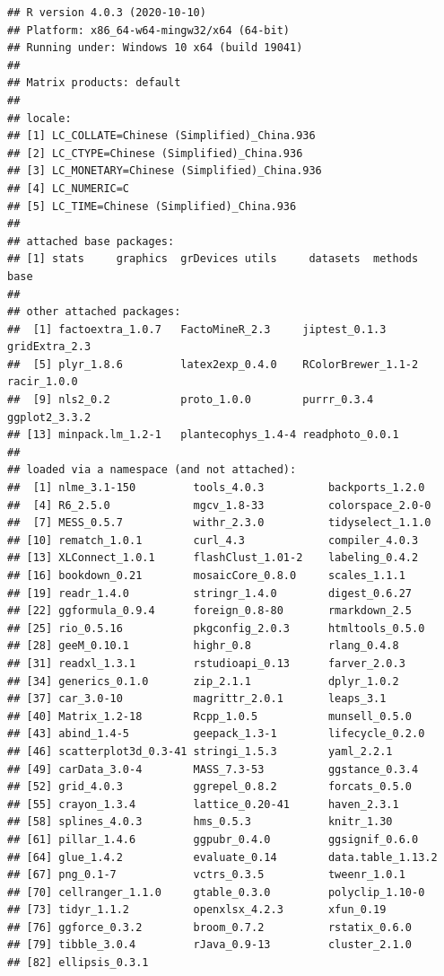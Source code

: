 \documentclass[
]{krantz}
\begin{document}
\begin{verbatim}
## R version 4.0.3 (2020-10-10)
## Platform: x86_64-w64-mingw32/x64 (64-bit)
## Running under: Windows 10 x64 (build 19041)
## 
## Matrix products: default
## 
## locale:
## [1] LC_COLLATE=Chinese (Simplified)_China.936 
## [2] LC_CTYPE=Chinese (Simplified)_China.936   
## [3] LC_MONETARY=Chinese (Simplified)_China.936
## [4] LC_NUMERIC=C                              
## [5] LC_TIME=Chinese (Simplified)_China.936    
## 
## attached base packages:
## [1] stats     graphics  grDevices utils     datasets  methods   base     
## 
## other attached packages:
##  [1] factoextra_1.0.7   FactoMineR_2.3     jiptest_0.1.3      gridExtra_2.3     
##  [5] plyr_1.8.6         latex2exp_0.4.0    RColorBrewer_1.1-2 racir_1.0.0       
##  [9] nls2_0.2           proto_1.0.0        purrr_0.3.4        ggplot2_3.3.2     
## [13] minpack.lm_1.2-1   plantecophys_1.4-4 readphoto_0.0.1   
## 
## loaded via a namespace (and not attached):
##  [1] nlme_3.1-150         tools_4.0.3          backports_1.2.0     
##  [4] R6_2.5.0             mgcv_1.8-33          colorspace_2.0-0    
##  [7] MESS_0.5.7           withr_2.3.0          tidyselect_1.1.0    
## [10] rematch_1.0.1        curl_4.3             compiler_4.0.3      
## [13] XLConnect_1.0.1      flashClust_1.01-2    labeling_0.4.2      
## [16] bookdown_0.21        mosaicCore_0.8.0     scales_1.1.1        
## [19] readr_1.4.0          stringr_1.4.0        digest_0.6.27       
## [22] ggformula_0.9.4      foreign_0.8-80       rmarkdown_2.5       
## [25] rio_0.5.16           pkgconfig_2.0.3      htmltools_0.5.0     
## [28] geeM_0.10.1          highr_0.8            rlang_0.4.8         
## [31] readxl_1.3.1         rstudioapi_0.13      farver_2.0.3        
## [34] generics_0.1.0       zip_2.1.1            dplyr_1.0.2         
## [37] car_3.0-10           magrittr_2.0.1       leaps_3.1           
## [40] Matrix_1.2-18        Rcpp_1.0.5           munsell_0.5.0       
## [43] abind_1.4-5          geepack_1.3-1        lifecycle_0.2.0     
## [46] scatterplot3d_0.3-41 stringi_1.5.3        yaml_2.2.1          
## [49] carData_3.0-4        MASS_7.3-53          ggstance_0.3.4      
## [52] grid_4.0.3           ggrepel_0.8.2        forcats_0.5.0       
## [55] crayon_1.3.4         lattice_0.20-41      haven_2.3.1         
## [58] splines_4.0.3        hms_0.5.3            knitr_1.30          
## [61] pillar_1.4.6         ggpubr_0.4.0         ggsignif_0.6.0      
## [64] glue_1.4.2           evaluate_0.14        data.table_1.13.2   
## [67] png_0.1-7            vctrs_0.3.5          tweenr_1.0.1        
## [70] cellranger_1.1.0     gtable_0.3.0         polyclip_1.10-0     
## [73] tidyr_1.1.2          openxlsx_4.2.3       xfun_0.19           
## [76] ggforce_0.3.2        broom_0.7.2          rstatix_0.6.0       
## [79] tibble_3.0.4         rJava_0.9-13         cluster_2.1.0       
## [82] ellipsis_0.3.1
\end{verbatim}

\cleardoublepage

  

\backmatter
\printindex
\end{document}
